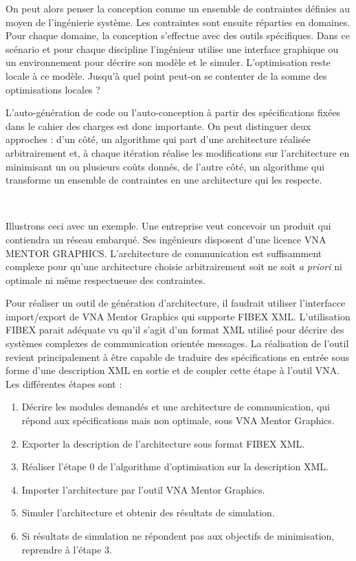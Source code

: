 \documentclass[11pt]{article}
\begin{document}
On peut alors penser la conception comme un ensemble de contraintes définies au
moyen de l'ingénierie système. Les contraintes sont ensuite réparties en
domaines. Pour chaque domaine, la conception s'effectue avec des outils
spécifiques. Dans ce scénario et pour chaque discipline l'ingénieur utilise une
interface graphique ou un environnement pour décrire son modèle et le simuler.
L'optimisation reste locale à ce modèle. Jusqu'à quel point peut-on se contenter
de la somme des optimisations locales ?

L’auto-génération de code ou l’auto-conception à partir des spécifications
fixées dans le cahier des charges est donc importante. On peut distinguer deux
approches : d'un côté, un algorithme qui part d’une architecture réalisée
arbitrairement et, à chaque itération réalise les modifications sur
l’architecture en minimisant un ou plusieurs coûts donnés, de l'autre côté, un
algorithme qui transforme un ensemble de contraintes en une architecture qui
les respecte.

~

Illustrons ceci avec un exemple. Une entreprise veut concevoir un produit qui
contiendra un réseau embarqué. Ses ingénieurs disposent d'une licence VNA MENTOR
GRAPHICS. L'architecture de communication est suffisamment complexe pour qu'une
architecture choisie arbitrairement soit ne soit \textit{a priori} ni optimale
ni même respectueuse des contraintes.

Pour réaliser un outil de génération d’architecture, il faudrait utiliser 
l’interfacce import/export de VNA Mentor Graphics qui supporte FIBEX XML.
L’utilisation FIBEX parait adéquate vu qu’il s’agit d’un format XML
utilisé pour décrire des systèmes complexes de communication orientée messages.
La réalisation de l’outil revient principalement à être capable de traduire des
spécifications en entrée sous forme d’une description XML en sortie et de 
coupler cette étape à l’outil VNA. Les différentes étapes sont :
\begin{enumerate}
\item Décrire les modules demandés et une architecture de communication, qui
répond aux spécifications mais non optimale, sous VNA Mentor Graphics.
\item Exporter la description de l’architecture sous format FIBEX XML.
\item Réaliser l’étape 0 de l’algorithme d’optimisation sur la description XML.
\item Importer l’architecture par l’outil VNA Mentor Graphics.
\item Simuler l’architecture et obtenir des résultats de simulation.
\item Si résultats de simulation ne répondent pas aux objectifs de minimisation,
reprendre à l’étape 3.
\end{enumerate}
\end{document}
